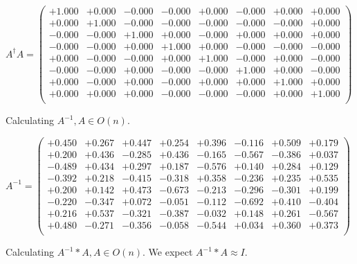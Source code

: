 \documentclass[9pt]{article}
\theoremstyle{plain}
\theoremstyle{definition}
\theoremstyle{remark}
\numberwithin{equation}{section}
\begin{document}
$A^{\dag} A = \left(
\begin{array}{
cccccccc}
+1.000 & +0.000 & -0.000 & -0.000 & +0.000 & -0.000 & +0.000 & +0.000 \\
+0.000 & +1.000 & -0.000 & -0.000 & -0.000 & -0.000 & -0.000 & +0.000 \\
-0.000 & -0.000 & +1.000 & +0.000 & -0.000 & +0.000 & +0.000 & +0.000 \\
-0.000 & -0.000 & +0.000 & +1.000 & +0.000 & -0.000 & -0.000 & -0.000 \\
+0.000 & -0.000 & -0.000 & +0.000 & +1.000 & -0.000 & +0.000 & -0.000 \\
-0.000 & -0.000 & +0.000 & -0.000 & -0.000 & +1.000 & +0.000 & -0.000 \\
+0.000 & -0.000 & +0.000 & -0.000 & +0.000 & +0.000 & +1.000 & +0.000 \\
+0.000 & +0.000 & +0.000 & -0.000 & -0.000 & -0.000 & +0.000 & +1.000 \\
\end{array}
\right)$ \newline 

Calculating $A^{-1} ,  A \in O(n)$.

$A^{-1} = \left(
\begin{array}{
cccccccc}
+0.450 & +0.267 & +0.447 & +0.254 & +0.396 & -0.116 & +0.509 & +0.179 \\
+0.200 & +0.436 & -0.285 & +0.436 & -0.165 & -0.567 & -0.386 & +0.037 \\
-0.489 & +0.434 & +0.297 & +0.187 & -0.576 & +0.140 & +0.284 & +0.129 \\
-0.392 & +0.218 & -0.415 & -0.318 & +0.358 & -0.236 & +0.235 & +0.535 \\
+0.200 & +0.142 & +0.473 & -0.673 & -0.213 & -0.296 & -0.301 & +0.199 \\
-0.220 & -0.347 & +0.072 & -0.051 & -0.112 & -0.692 & +0.410 & -0.404 \\
+0.216 & +0.537 & -0.321 & -0.387 & -0.032 & +0.148 & +0.261 & -0.567 \\
+0.480 & -0.271 & -0.356 & -0.058 & -0.544 & +0.034 & +0.360 & +0.373 \\
\end{array}
\right)$ \newline 

Calculating $A^{-1} *A  ,  A \in O(n)$.   We expect $A^{-1} *A  \approx I$. 
\end{document}
